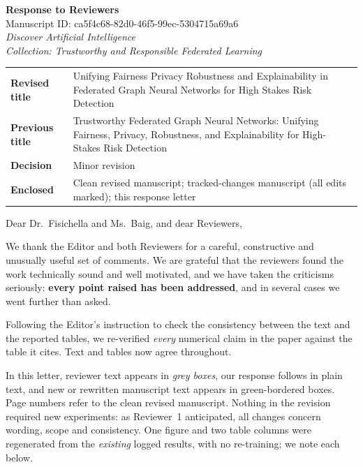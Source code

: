\documentclass[11pt,a4paper]{article}
\begin{document}
\begin{center}
{\Large\bfseries Response to Reviewers}\\[0.6em]
{\large Manuscript ID: ca5f4c68-82d0-46f5-99ec-5304715a69a6}\\[0.4em]
{\large\itshape Discover Artificial Intelligence}\\[0.2em]
{\itshape Collection: Trustworthy and Responsible Federated Learning}
\end{center}

\vspace{0.5em}

\begin{tabular}{@{}p{3.1cm}p{13.2cm}@{}}
\textbf{Revised title} & Unifying Fairness Privacy Robustness and Explainability
in Federated Graph Neural Networks for High Stakes Risk Detection \\[0.35em]
\textbf{Previous title} & Trustworthy Federated Graph Neural Networks: Unifying
Fairness, Privacy, Robustness, and Explainability for High-Stakes Risk
Detection \\[0.35em]
\textbf{Decision} & Minor revision \\[0.35em]
\textbf{Enclosed} & Clean revised manuscript; tracked-changes manuscript
(all edits marked); this response letter \\
\end{tabular}

\vspace{1em}

Dear Dr.\ Fisichella and Ms.\ Baig, and dear Reviewers,

We thank the Editor and both Reviewers for a careful, constructive and unusually
useful set of comments. We are grateful that the reviewers found the work
technically sound and well motivated, and we have taken the criticisms seriously:
\textbf{every point raised has been addressed}, and in several cases we went
further than asked.

Following the Editor's instruction to check the consistency between the text and
the reported tables, we re-verified \emph{every} numerical claim in the paper
against the table it cites. Text and tables now agree throughout.

In this letter, reviewer text appears in \emph{grey boxes}, our response follows
in plain text, and new or rewritten manuscript text appears in
\textcolor{newtext}{green-bordered boxes}. Page numbers refer to the clean
revised manuscript. Nothing in the revision required new experiments: as
Reviewer~1 anticipated, all changes concern wording, scope and consistency. One
figure and two table columns were regenerated from the \emph{existing} logged
results, with no re-training; we note each below.
\end{document}
